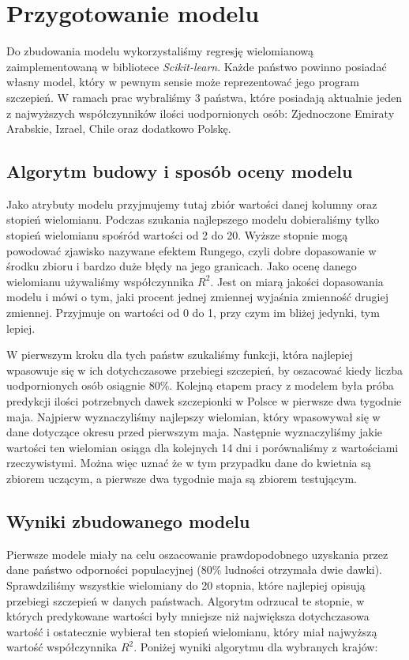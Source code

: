 \documentclass[12pt, oneside]{article}
\begin{document}
\section{Przygotowanie modelu} 

Do zbudowania modelu wykorzystaliśmy regresję wielomianową zaimplementowaną w bibliotece \emph{Scikit-learn}. Każde państwo powinno posiadać własny model, który w pewnym sensie może reprezentować jego program szczepień. W ramach prac wybraliśmy 3 państwa, które posiadają aktualnie jeden z najwyższych współczynników ilości uodpornionych osób: Zjednoczone Emiraty Arabskie, Izrael, Chile oraz dodatkowo Polskę. 

\subsection{Algorytm budowy i sposób oceny modelu}

Jako atrybuty modelu przyjmujemy tutaj zbiór wartości danej kolumny oraz stopień wielomianu. Podczas szukania najlepszego modelu dobieraliśmy tylko stopień wielomianu spośród wartości od 2 do 20. Wyższe stopnie mogą powodować zjawisko nazywane efektem Rungego, czyli dobre dopasowanie w środku zbioru i bardzo duże błędy na jego granicach. Jako ocenę danego wielomianu używaliśmy współczynnika $R^{2}$. Jest on miarą jakości dopasowania modelu i mówi o tym, jaki procent jednej zmiennej wyjaśnia zmienność drugiej zmiennej. Przyjmuje on wartości od 0 do 1, przy czym im bliżej jedynki, tym lepiej.

W pierwszym kroku dla tych państw szukaliśmy funkcji, która najlepiej wpasowuje się w ich dotychczasowe przebiegi szczepień, by oszacować kiedy liczba uodpornionych osób osiągnie 80\%. Kolejną etapem pracy z modelem była próba predykcji ilości potrzebnych dawek szczepionki w Polsce w pierwsze dwa tygodnie maja. Najpierw wyznaczyliśmy najlepszy wielomian, który wpasowywał się w dane dotyczące okresu przed pierwszym maja. Następnie wyznaczyliśmy jakie wartości ten wielomian osiąga dla kolejnych 14 dni i porównaliśmy z wartościami rzeczywistymi. Można więc uznać że w tym przypadku dane do kwietnia są zbiorem uczącym, a pierwsze dwa tygodnie maja są zbiorem testującym.   

\subsection{Wyniki zbudowanego modelu}

Pierwsze modele miały na celu oszacowanie prawdopodobnego uzyskania przez dane państwo odporności populacyjnej (80\% ludności otrzymała dwie dawki). Sprawdziliśmy wszystkie wielomiany do 20 stopnia, które najlepiej opisują przebiegi szczepień w danych państwach. Algorytm odrzucał te stopnie, w których predykowane wartości były mniejsze niż największa dotychczasowa wartość i ostatecznie wybierał ten stopień wielomianu, który miał najwyższą wartość współczynnika $R^2$. Poniżej wyniki algorytmu dla wybranych krajów:
\end{document}
